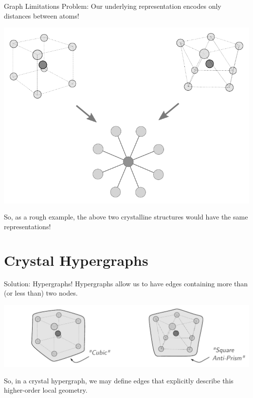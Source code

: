 \documentclass[11pt]{beamer}
\begin{document}
\begin{frame}{Graph Limitations}
Problem: \pause Our underlying representation encodes only distances between atoms!\pause

\begin{center}

\includegraphics[scale=0.7]{crystalgraph_cntex.pdf}

\end{center}

So, as a rough example, the above two crystalline structures would have the same representations!
\end{frame} 

\section{Crystal Hypergraphs}
\begin{frame}{Solution: Hypergraphs!}
Hypergraphs allow us to have edges containing more than (or less than) two nodes.\pause 

\vspace{.5cm}

\begin{center}
\includegraphics[scale=0.52]{crystalgraph_cntex_3.pdf}
\end{center}

\vspace{.5cm}

So, in a crystal hypergraph, we may define edges that explicitly describe this higher-order local geometry.
\end{frame}
\end{document}
